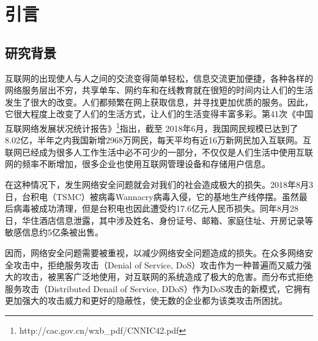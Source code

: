 \chapter{引言}
\label{cha:intro}

\section{研究背景}
\label{sec:background}

互联网的出现使人与人之间的交流变得简单轻松，信息交流更加便捷，各种各样的网络服务层出不穷，共享单车、网约车和在线教育就在很短的时间内让人们的生活发生了很大的改变。人们都频繁在网上获取信息，并寻找更加优质的服务。因此，它很大程度上改变了人们的生活方式，让人们的生活变得丰富多彩。第41次《中国互联网络发展状况统计报告》\footnote{http://cac.gov.cn/wxb\_pdf/CNNIC42.pdf}指出，截至 2018年6月，我国网民规模已达到了8.02亿，半年之内我国新增2968万网民，每天平均有近16万新网民加入互联网。互联网已经成为很多人工作生活中必不可少的一部分，不仅仅是人们生活中使用互联网的频率不断增加，很多企业也使用互联网管理设备和存储用户信息。

在这种情况下，发生网络安全问题就会对我们的社会造成极大的损失。2018年8月3日，台积电（TSMC）被病毒Wannacry病毒入侵，它的基地生产线停摆。虽然最后病毒被成功清理，但是台积电也因此遭受约17.6亿元人民币损失。同年8月28日，华住酒店信息泄露，其中涉及姓名、身份证号、邮箱、家庭住址、开房记录等敏感信息约5亿条被出售。

因而，网络安全问题需要被重视，以减少网络安全问题造成的损失。在众多网络安全攻击中，拒绝服务攻击（Denial of Service, DoS）攻击作为一种普遍而又威力强大的攻击，被黑客广泛地使用，对互联网的系统造成了极大的危害。而分布式拒绝服务攻击（Distributed Denail of Service, DDoS）作为DoS攻击的新模式，它拥有更加强大的攻击威力和更好的隐蔽性，使无数的企业都为该类攻击所困扰。


